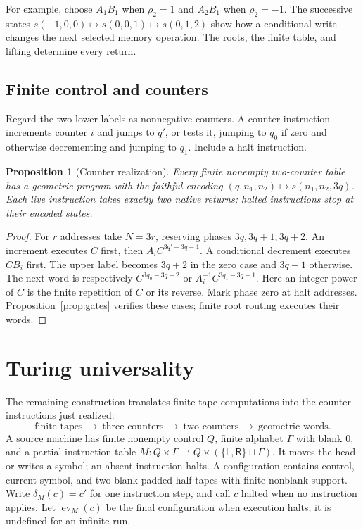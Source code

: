 \documentclass[11pt]{article}
\theoremstyle{definition}
\theoremstyle{plain}
\newtheorem{proposition}[definition]{Proposition}
\newcommand{\ev}{\operatorname{ev}}
\begin{document}
For example, choose $A_1B_1$ when $\rho_2=1$ and $A_2B_1$ when
$\rho_2=-1$. The successive states
$s(-1,0,0)\mapsto s(0,0,1)\mapsto s(0,1,2)$ show how a conditional
write changes the next selected memory operation. The roots,
the finite table, and lifting determine every return.

\subsection*{Finite control and counters}
Regard the two lower labels as nonnegative counters. A counter
instruction increments counter $i$ and jumps to $q'$, or tests it,
jumping to $q_0$ if zero and otherwise decrementing and jumping to
$q_1$. Include a halt instruction.

\begin{proposition}[Counter realization]\label{prop:counters}
Every finite nonempty two-counter table has a geometric program with the
faithful encoding $(q,n_1,n_2)\mapsto s(n_1,n_2,3q)$.
Each live instruction takes exactly two native returns; halted
instructions stop at their encoded states.
\end{proposition}
\begin{proof}
For $r$ addresses take $N=3r$, reserving phases $3q,3q+1,3q+2$.
An increment executes $C$ first, then $A_iC^{3q'-3q-1}$.
A conditional decrement executes $CB_i$ first. The upper label
becomes $3q+2$ in the zero case and $3q+1$ otherwise.
The next word is respectively $C^{3q_0-3q-2}$ or
$A_i^{-1}C^{3q_1-3q-1}$. Here an integer power of $C$ is the
finite repetition of $C$ or its reverse. Mark phase zero at halt
addresses. Proposition~\ref{prop:gates} verifies these cases;
finite root routing executes their words.
\end{proof}

\section{Turing universality}\label{sec:universality}

The remaining construction translates finite tape computations into
the counter instructions just realized:
\[
 \text{finite tapes}\ \longrightarrow\
 \text{three counters}\ \longrightarrow\
 \text{two counters}\ \longrightarrow\
 \text{geometric words}.
\]
A source machine has finite nonempty control $Q$, finite alphabet
$\Gamma$ with blank $0$, and a partial instruction table
$M:Q\times\Gamma\rightharpoonup
Q\times(\{\mathsf L,\mathsf R\}\sqcup\Gamma)$.
It moves the head or writes a symbol; an absent instruction halts.
A configuration contains control, current symbol, and two
blank-padded half-tapes with finite nonblank support.
Write $\delta_M(c)=c'$ for one instruction step, and call $c$ halted
when no instruction applies. Let $\ev_M(c)$ be the final configuration
when execution halts; it is undefined for an infinite run.
\end{document}
